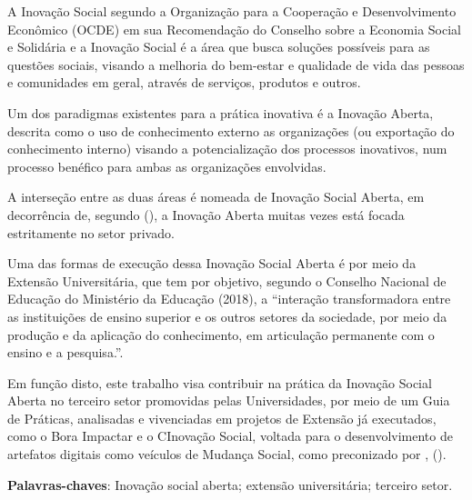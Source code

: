 \begin{resumo}[Resumo] 
A Inovação Social segundo a Organização para a Cooperação e Desenvolvimento Econômico (OCDE) em sua Recomendação do Conselho sobre a Economia Social e
Solidária e a Inovação Social \cite{ocde2024social} é a área que busca soluções possíveis para as questões sociais, visando a melhoria do bem-estar e qualidade de vida das pessoas e comunidades em geral, através de serviços, produtos e outros. 

Um dos paradigmas existentes para a prática inovativa é a Inovação Aberta, descrita como o uso de conhecimento externo as organizações (ou exportação do conhecimento interno) visando a potencialização dos processos inovativos, num processo benéfico para ambas as organizações envolvidas. 

A interseção entre as duas áreas é nomeada de Inovação Social Aberta, em decorrência de, segundo \citeauthor{chesbrough2014} (\citeyear{chesbrough2014}), a Inovação Aberta muitas vezes está focada estritamente no setor privado. 

Uma das formas de execução dessa Inovação Social Aberta é por meio da Extensão Universitária, que tem por objetivo, segundo o Conselho Nacional de Educação do Ministério da Educação (2018), a “interação transformadora entre as instituições de ensino superior e os outros setores da sociedade, por meio da produção e da aplicação do conhecimento, em articulação permanente com o ensino e a pesquisa.”. 

Em função disto, este trabalho visa contribuir na prática da Inovação Social Aberta no terceiro setor promovidas pelas Universidades, por meio de um Guia de Práticas, analisadas e vivenciadas em projetos de Extensão já executados, como o Bora Impactar e o CInovação Social, voltada para o desenvolvimento de artefatos digitais como veículos de Mudança Social, como preconizado por \citeauthor{ferrario2014}, (\citeyear{ferrario2014}).

 \vspace{\onelineskip}
    
 \noindent
 \textbf{Palavras-chaves}: Inovação social aberta; extensão universitária; terceiro setor.
\end{resumo}



